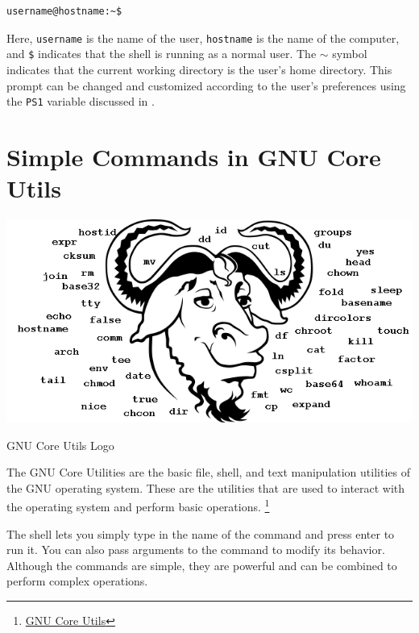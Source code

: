 \begin{lstlisting}[language=bash]
  username@hostname:~$
\end{lstlisting}

Here, \texttt{username} is the name of the user, \texttt{hostname} is the name of the computer, and \texttt{\$} indicates that the shell is running as a normal user.
The $\sim$ symbol indicates that the current working directory is the user's home directory.
 This prompt can be changed and customized according to the user's preferences using the \texttt{PS1} variable discussed in .

\vfill
\pagebreak
\section{Simple Commands in GNU Core Utils}

\begin{marginfigure}
	\includegraphics{images/png/gnu.png}
	\caption[GNU Core Utils Logo]{GNU Core Utils Logo}
\end{marginfigure}

\begin{definition}
  The GNU Core Utilities are the basic file, shell, and text manipulation utilities of the GNU operating system. These are the utilities that are used to interact with the operating system and perform basic operations.
  \footnote{
    \href{https://www.gnu.org/software/coreutils/}{GNU Core Utils}
  }
\end{definition}

The shell lets you simply type in the name of the command and press enter to run it.
You can also pass arguments to the command to modify its behavior.
Although the commands are simple, they are powerful and can be combined to perform complex operations.


